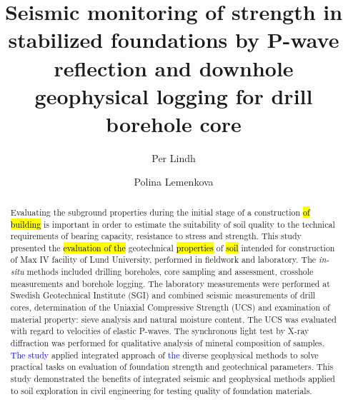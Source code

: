 \documentclass[USenglish,twocolumn]{article}
\begin{document}
 
\author[1]{Per Lindh}
\author*[2]{Polina Lemenkova}

  \title{\huge Seismic monitoring of strength in stabilized foundations by P-wave reflection and downhole geophysical logging for drill borehole core}
  

\begin{abstract}
{Evaluating the subground properties during the initial stage of a construction \hl{of building} is important in order to estimate the suitability of soil quality to the technical requirements of bearing capacity, resistance to stress and strength. This study presented the \hl{evaluation of the }geotechnical \hl{properties} of \hl{soil} intended for construction of Max IV facility of Lund University, performed in fieldwork and laboratory. The \emph{in-situ} methods included drilling boreholes, core sampling and assessment, crosshole measurements and borehole logging. The laboratory measurements were performed at Swedish Geotechnical Institute (SGI) and combined seismic measurements of drill cores, determination of the Uniaxial Compressive Strength (UCS) and examination of material property: sieve analysis and natural moisture content. The UCS was evaluated with regard to velocities of elastic P-waves. The synchronous light test by X-ray diffraction was performed for qualitative analysis of mineral composition of samples. \textcolor{blue}{The study }applied integrated approach of \textcolor{blue}{the }diverse geophysical methods to solve practical tasks on evaluation of foundation strength and geotechnical parameters. This study demonstrated the benefits of integrated seismic and geophysical methods applied to soil exploration in civil engineering for testing quality of foundation materials.}
\end{abstract}
 
\end{document}
